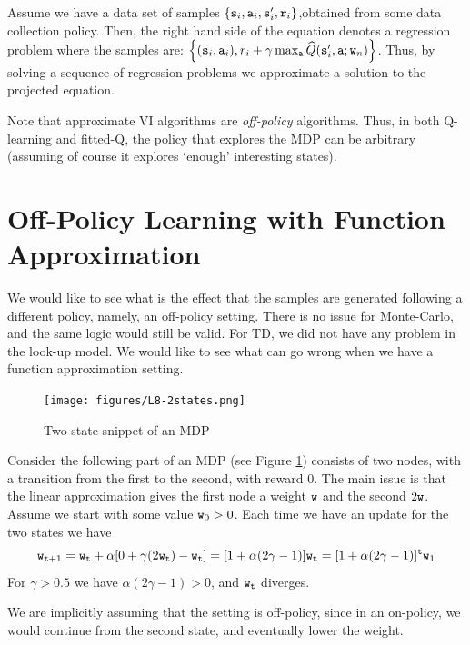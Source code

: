 Assume we have a data set of samples $\{{\tt s}_i,{\tt a}_i,{\tt s}'_i,{\tt r}_i\}$,obtained from some data collection policy. Then, the right hand side of the equation denotes a regression problem where the samples are: $\left\{({\tt s}_i,{\tt a}_i), r_i + \gamma \max_{\tt a} \widehat{Q}({\tt s}'_i, {\tt a};{\tt w}_{n})\right\}$. Thus, by solving a sequence of regression problems we approximate a solution to the projected equation.

Note that approximate VI algorithms are \emph{off-policy} algorithms. Thus, in both Q-learning and fitted-Q, the policy that explores the MDP can be arbitrary (assuming of course it explores `enough' interesting states).

\section{Off-Policy Learning with Function Approximation}
\label{sec:off_policy_FA}

We would like to see what is the effect that the samples are generated
following a different policy, namely, an off-policy setting. There
is no issue for Monte-Carlo, and the same logic would still be
valid.  For TD, we did not have any problem in the look-up model. We
would like to see what can go wrong when we have a function
approximation setting.


\begin{figure}
  \begin{centering}
  \texttt{[image: figures/L8-2states.png]}\\
  \caption{Two state snippet of an MDP }\label{fig:L8-2state}
  \end{centering}
\end{figure}

Consider the following part of an MDP (see Figure
\ref{fig:L8-2state}) consists of two nodes, with a transition from
the first to the second, with reward $0$. The main issue is that the
linear approximation gives the first node a weight ${\tt w}$ and the
second $2{\tt w}$. Assume we start with some value ${\tt w}_0>0$.
Each time we have an update for the two states we have
\[
{\tt w}_{{\tt t}+1}={\tt w}_{\tt t} +\alpha[0+\gamma
(2{\tt w}_{\tt t})-{\tt w}_{\tt t}]=[1+\alpha(2\gamma-1)]{\tt w}_{\tt t}=[1+\alpha(2\gamma-1)]^{\tt t}{\tt w}_1
\]
For $\gamma>0.5$ we have $\alpha(2\gamma-1)>0$, and ${\tt w}_{\tt t}$
diverges.

We are implicitly assuming that the setting is off-policy, since in
an on-policy, we would continue from the second state, and
eventually lower the weight.

